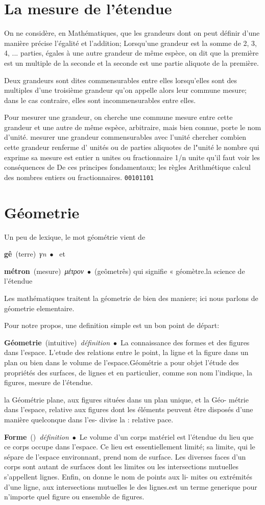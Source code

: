 \documentclass[12pt,a4paper,oneside]{article} %
\newcommand{\entry}[4]{\markboth{#1}{#1}\textbf{#1}\ {(#2)}\ \textit{#3}\ $\bullet$\ {#4}}  %
\newcommand{\HAMA}[1]{\lstinline[style=hama]{#1}}
\begin{document}
\section{La mesure de l'étendue}

On ne considère, en Mathématiques, que les grandeurs dont on peut définir
d'une manière précise l'égalité et l'addition;
Lorsqu'une grandeur est la somme de 2, 3, 4, ...
parties, égales à une autre grandeur de même espèce, on dit que la première est un multiple de la seconde et la seconde est une partie aliquote de la première.

Deux grandeurs sont dites commensurables entre elles lorsqu'elles
sont des multiples d'une troisième grandeur qu'on appelle alors leur commune mesure; dans le cas contraire, elles sont incommensurables entre elles.

Pour mesurer une grandeur, on cherche une commune mesure entre cette grandeur et
une autre de même espèce, arbitraire, mais bien connue, porte le nom d'unité.
mesurer une grandeur commensurables avec l'unité chercher combien cette grandeur renferme d' unités ou de parties  aliquotes de
l"unité
le nombre qui exprime sa mesure est entier n unites ou fractionnaire 1/n unite
 qu'il faut voir les conséquences de
De ces principes fondamentaux; les règles Arithmétique calcul des nombres
entiers ou fractionnaires.
\HAMA{00101101}

\section{Géometrie }

Un peu de lexique, le mot géométrie vient de  \entry{gê}{terre}{γn}{} et \entry{métron}{mesure}{μέτρον} (geômetrês) qui signifie « géomètre.la
science de l'étendue


Les mathématiques traitent la géometrie de bien des maniere; ici nous parlons de géometrie elementaire.

Pour notre propos, une definition simple est un bon point de départ:

\entry{Géometrie}{intuitive}{définition}{La connaissance des formes et des figures dans l'espace. L'etude des relations entre le point, la ligne et la figure dans un plan ou bien dans le volume de l'espace.Géométrie a pour objet l'étude des propriétés des
surfaces, de lignes
et
en particulier,
comme
son
nom
l'indique, la
figures,
mesure de
l'étendue.}

  la Géométrie plane,
aux figures situées dans un plan unique, et la Géo-
métrie dans l'espace, relative aux figures dont les éléments
peuvent être disposés d'une manière quelconque dans l'es-
divise la
:
relative
pace.
\entry{Forme}{}{définition}{Le volume d'un corps matériel
est l'étendue
du lieu que
ce corps occupe dans l'espace. Ce lieu est essentiellement
limité; sa limite, qui le sépare de l'espace environnant,
prend
nom
de surface. Les diverses faces d'un corps sont autant
de surfaces dont les limites ou les intersections mutuelles
s'appellent lignes. Enfin, on donne le nom de points aux li-
mites ou extrémités d'une ligne, aux intersections mutuelles
le
des lignes.est un terme generique pour n'importe quel figure ou ensemble de figures. }
\end{document}
